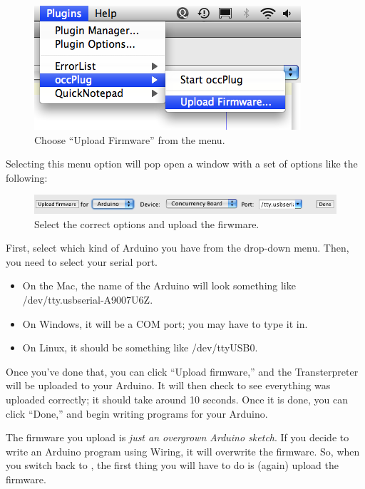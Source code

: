 \begin{figure}[!ht]
	\centering
		\includegraphics[width=0.6\linewidth]{images/20110115-upload-firmware}
	\caption{Choose ``Upload Firmware'' from the \occplug menu.}
	\label{images:20110115-upload-firmware}
\end{figure}

Selecting this menu option will pop open a window with a set of options like the following:

\begin{figure}[!ht]
	\centering
		\includegraphics[width=0.9\linewidth]{images/20110115-upload-firmware-window}
	\caption{Select the correct options and upload the firwmare.}
	\label{images:20110115-upload-firmware-window}
\end{figure}

First, select which kind of Arduino you have from the drop-down menu. Then, you need to select your serial port.

\begin{itemize}
	\item On the Mac, the name of the Arduino will look something like {\code /dev/tty.usbserial-A9007U6Z}. 
	\item On Windows, it will be a COM port; you may have to type it in.
	\item On Linux, it should be something like {\code /dev/ttyUSB0}.
\end{itemize}

\newpage

Once you've done that, you can click ``Upload firmware,'' and the Transterpreter will be uploaded to your Arduino. It will then check to see everything was uploaded correctly; it should take around 10 seconds. Once it is done, you can click ``Done,'' and begin writing \occam programs for your Arduino.

\vspace{1cm}
\begin{warning}
The firmware you upload is {\em just an overgrown Arduino sketch}. If you decide to write an Arduino program using Wiring, it will overwrite the \plumbing firmware. So, when you switch back to \occam, the first thing you will have to do is (again) upload the firmware.
\end{warning}
\vspace{1cm}

